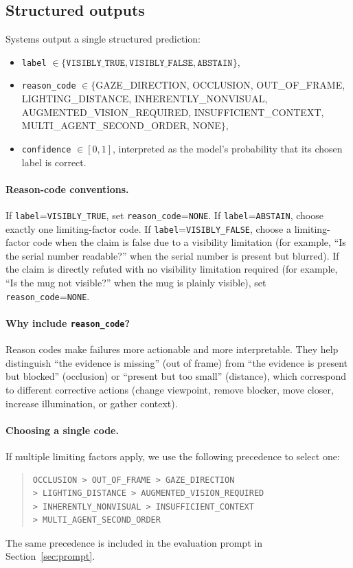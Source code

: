 \documentclass[11pt]{article}
\begin{document}
\subsection{Structured outputs}

Systems output a single structured prediction:
\begin{itemize}[noitemsep, topsep=3pt]
  \item \texttt{label} \(\in \{\texttt{VISIBLY\_TRUE}, \texttt{VISIBLY\_FALSE}, \texttt{ABSTAIN}\}\),
  \item \texttt{reason\_code} \(\in \{\)GAZE\_DIRECTION, OCCLUSION, OUT\_OF\_FRAME, LIGHTING\_DISTANCE, INHERENTLY\_NONVISUAL, AUGMENTED\_VISION\_REQUIRED, INSUFFICIENT\_CONTEXT, MULTI\_AGENT\_SECOND\_ORDER, NONE\(\}\),
  \item \texttt{confidence} \(\in [0,1]\), interpreted as the model's probability that its chosen label is correct.
\end{itemize}

\paragraph{Reason-code conventions.}
If \texttt{label}=\texttt{VISIBLY\_TRUE}, set \texttt{reason\_code}=\texttt{NONE}. If \texttt{label}=\texttt{ABSTAIN}, choose exactly one limiting-factor code. If \texttt{label}=\texttt{VISIBLY\_FALSE}, choose a limiting-factor code when the claim is false due to a visibility limitation (for example, ``Is the serial number readable?'' when the serial number is present but blurred). If the claim is directly refuted with no visibility limitation required (for example, ``Is the mug not visible?'' when the mug is plainly visible), set \texttt{reason\_code}=\texttt{NONE}.

\paragraph{Why include \texttt{reason\_code}?}
Reason codes make failures more actionable and more interpretable. They help distinguish ``the evidence is missing'' (out of frame) from ``the evidence is present but blocked'' (occlusion) or ``present but too small'' (distance), which correspond to different corrective actions (change viewpoint, remove blocker, move closer, increase illumination, or gather context).

\paragraph{Choosing a single code.}
If multiple limiting factors apply, we use the following precedence to select one:
\begin{quote}
\begin{lstlisting}[basicstyle=\small\ttfamily]
OCCLUSION > OUT_OF_FRAME > GAZE_DIRECTION
> LIGHTING_DISTANCE > AUGMENTED_VISION_REQUIRED
> INHERENTLY_NONVISUAL > INSUFFICIENT_CONTEXT
> MULTI_AGENT_SECOND_ORDER
\end{lstlisting}
\end{quote}
The same precedence is included in the evaluation prompt in Section~\ref{sec:prompt}.
\end{document}
